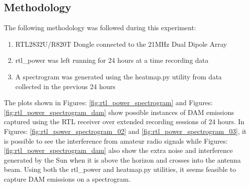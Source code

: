 \documentclass[runningheads,a4paper]{llncs}
\begin{document}
\subsection*{Methodology}
The following methodology was followed during this experiment:

\begin{enumerate}
	\item RTL2832U/R820T Dongle connected to the 21MHz Dual Dipole Array
	\item rtl\_power was left running for 24 hours at a time recording data
	\item A spectrogram was generated using the heatmap.py utility from data collected in the previous 24 hours
\end{enumerate}

The plots shown in Figures: \ref{fig:rtl_power_spectrogram} and Figures: \ref{fig:rtl_power_spectrogram_dam} show possible instances of \gls{DAM} emissions captured using the RTL receiver over extended recording sessions of 24 hours. In Figures: \ref{fig:rtl_power_spectrogram_02} and  \ref{fig:rtl_power_spectrogram_03}, it is possible to see the interference from amateur radio signals while Figures: \ref{fig:rtl_power_spectrogram_dam} also show the extra noise and interference generated by the Sun when it is above the horizon and crosses into the antenna beam. Using both the rtl\_power and heatmap.py utilities, it seems feasible to capture \gls{DAM} emissions on a spectrogram.

\end{document}
